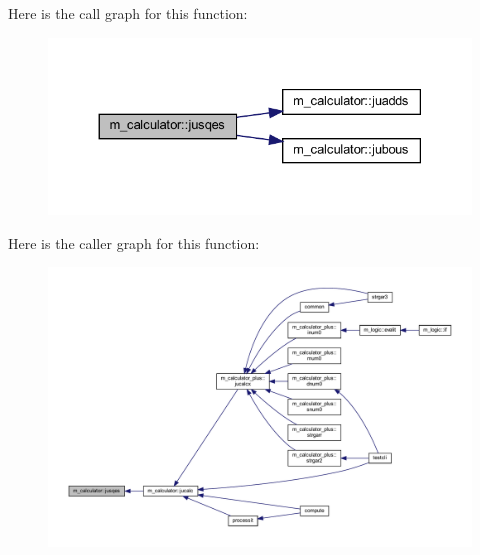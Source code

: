 Here is the call graph for this function\+:
\nopagebreak
\begin{figure}[H]
\begin{center}
\leavevmode
\includegraphics[width=330pt]{namespacem__calculator_a1c053df0b605f7d96a5982c44a9a1d11_cgraph}
\end{center}
\end{figure}
Here is the caller graph for this function\+:
\nopagebreak
\begin{figure}[H]
\begin{center}
\leavevmode
\includegraphics[width=350pt]{namespacem__calculator_a1c053df0b605f7d96a5982c44a9a1d11_icgraph}
\end{center}
\end{figure}
\mbox{\label{namespacem__calculator_a8337bfb59665d3236fed48d316e3701b}} 
